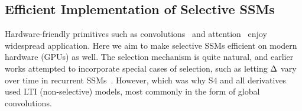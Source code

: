 \subsection{Efficient Implementation of Selective SSMs}
\label{sec:method:scan}

%

Hardware-friendly primitives such as convolutions~\citep{krizhevsky2012imagenet} and attention~\citep{bahdanau2015neural,vaswani2017attention} enjoy widespread application.
Here we aim to make selective SSMs efficient on modern hardware (GPUs) as well.
The selection mechanism is quite natural, and earlier works attempted to incorporate special cases of selection, such as letting $\Delta$ vary over time in recurrent SSMs~\citep{gu2020hippo}.
However,
\iftoggle{arxiv}{
as previously mentioned a core limitation in the usage of SSMs is their computational efficiency,
}{
this was computationally difficult,
}
which was why S4 and all derivatives used LTI (non-selective) models, most commonly in the form of global convolutions.

